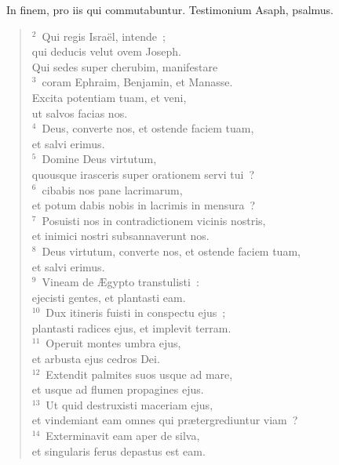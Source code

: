 ~\lettrine[lines=10,image=true,loversize=0.05,lraise=-0.03]{I}{}n finem, pro iis qui commutabuntur. Testimonium Asaph, psalmus.
\begin{flushleft}\begin{verse}\vspace{6pt}${}^{2}$~Qui regis Isra\"el, intende~;\\ qui deducis velut ovem Joseph.\\ Qui sedes super cherubim, manifestare\\
${}^{3}$~coram Ephraim, Benjamin, et Manasse.\\ Excita potentiam tuam, et veni,\\ ut salvos facias nos.\\
${}^{4}$~Deus, converte nos, et ostende faciem tuam,\\ et salvi erimus.\\
${}^{5}$~Domine Deus virtutum,\\ quousque irasceris super orationem servi tui~?\\
${}^{6}$~cibabis nos pane lacrimarum,\\ et potum dabis nobis in lacrimis in mensura~?\\
${}^{7}$~Posuisti nos in contradictionem vicinis nostris,\\ et inimici nostri subsannaverunt nos.\\
${}^{8}$~Deus virtutum, converte nos, et ostende faciem tuam,\\ et salvi erimus.\\
${}^{9}$~Vineam de \AE gypto transtulisti~:\\ ejecisti gentes, et plantasti eam.\\
${}^{10}$~Dux itineris fuisti in conspectu ejus~;\\ plantasti radices ejus, et implevit terram.\\
${}^{11}$~Operuit montes umbra ejus,\\ et arbusta ejus cedros Dei.\\
${}^{12}$~Extendit palmites suos usque ad mare,\\ et usque ad flumen propagines ejus.\\
${}^{13}$~Ut quid destruxisti maceriam ejus,\\ et vindemiant eam omnes qui pr\ae tergrediuntur viam~?\\
${}^{14}$~Exterminavit eam aper de silva,\\ et singularis ferus depastus est eam.\\

\end{verse}
\end{flushleft}
